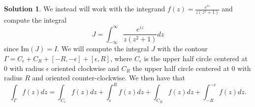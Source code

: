 \documentclass[12pt]{article}
\renewcommand{\Im}{\text{Im}}
\theoremstyle{definition}
\newtheorem{sol}{Solution}
\theoremstyle{remark}
\begin{document}
\begin{sol}
    We instead will work with the integrand $f(z) = \frac{e^{iz}}{z(z^{2} + 1)}$ and compute the integral
\begin{equation*}
    J = \int_{-\infty}^{\infty} \frac{e^{iz}}{z(z^{2} + 1)} dz
\end{equation*}
since $\Im(J) = I$. We will compute the integral $J$ with the contour $\Gamma = C_\epsilon + C_R + [-R, -\epsilon] + [\epsilon, R]$, where $C_\epsilon$ is the upper half circle centered at 0 with radius $\epsilon$ oriented clockwise and $C_{R}$ the upper half circle centered at 0 with radius $R$ and oriented counter-clockwise. We then have that
\begin{equation*}
    \int_{\Gamma} f(z) dz = \int_{C_{\epsilon}} f(z)dz +  \int_{\epsilon}^{R} f(z)dz +  \int_{C_{R}} f(z)dz +  \int_{-R}^{-\epsilon} f(z)dz. 
\end{equation*}


\end{sol}
\end{document}
